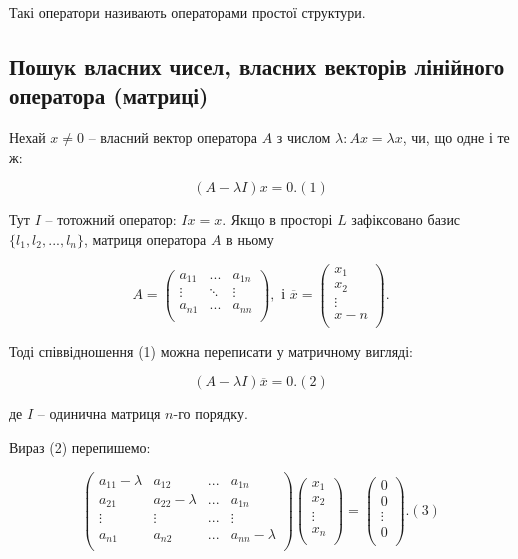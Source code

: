 Такі оператори називають операторами простої структури.

\subsection*{Пошук власних чисел, власних векторів лінійного оператора (матриці)}


Нехай $x \neq 0$ -- власний вектор оператора $A$ з числом $\lambda: A x = \lambda x$, чи, що
одне і те ж:

$$ (A - \lambda I) x = 0. (1)$$

Тут $I$ -- тотожний оператор: $Ix = x$. Якщо в просторі $L$ зафіксовано базис
$\{l_1, l_2, ..., l_n\}$, матриця оператора $A$ в ньому

$$A = \begin{pmatrix}
	a_{11} & ...    & a_{1n} \\
	\vdots & \ddots & \vdots \\
	a_{n1} & ...    & a_{nn} \\
\end{pmatrix}, \text{ і } \overline{x} = \begin{pmatrix}
	x_1 \\
	x_2 \\
	\vdots \\
	x-n \\
\end{pmatrix}.$$

Тоді співвідношення (1) можна переписати у матричному вигляді:

$$(A - \lambda I) \overline{x} = 0. (2)$$

де $I$ -- одинична матриця $n$-го порядку.

Вираз (2) перепишемо:

$$\begin{pmatrix}
	a_{11} - \lambda & a_{12} & ... & a_{1n} \\
	a_{21} & a_{22} - \lambda & ... & a_{1n} \\
	\vdots & \vdots & ... & \vdots \\
	a_{n1} & a_{n2} & ... & a_{nn} - \lambda \\
\end{pmatrix} \begin{pmatrix}
	x_1 \\
	x_2 \\
	\vdots \\
	x_n \\
\end{pmatrix} = \begin{pmatrix}
	0 \\
	0 \\
	\vdots \\
	0 \\
\end{pmatrix}. (3)$$

